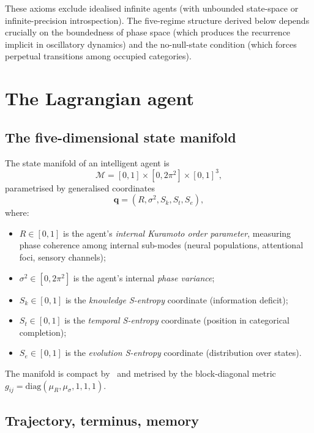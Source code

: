 \documentclass[11pt,twocolumn,a4paper]{article}
\newcommand{\M}{\mathcal{M}}
\newcommand{\Sk}{S_k}
\newcommand{\St}{S_t}
\newcommand{\Se}{S_e}
\newcommand{\qvec}{\mathbf{q}}
\begin{document}
\begin{remark}\label{rem:axioms}
These axioms exclude idealised infinite agents (with unbounded
state-space or infinite-precision introspection). The five-regime
structure derived below depends crucially on the boundedness of phase
space (which produces the recurrence implicit in
oscillatory dynamics) and the no-null-state condition (which forces
perpetual transitions among occupied categories).
\end{remark}

\section{The Lagrangian agent}
\label{sec:agent}

\subsection{The five-dimensional state manifold}

\begin{definition}\label{def:mfld}
The state manifold of an intelligent agent is
\[
\M = [0,1]\times[0,2\pi^2]\times[0,1]^3,
\]
parametrised by generalised coordinates
\[
\qvec=(R,\sigma^2,\Sk,\St,\Se),
\]
where:
\begin{itemize}[leftmargin=*]
\item $R\in[0,1]$ is the agent's \emph{internal Kuramoto order
parameter}, measuring phase coherence among internal sub-modes (neural
populations, attentional foci, sensory channels);
\item $\sigma^2\in[0,2\pi^2]$ is the agent's internal \emph{phase
variance};
\item $\Sk\in[0,1]$ is the \emph{knowledge S-entropy} coordinate
(information deficit);
\item $\St\in[0,1]$ is the \emph{temporal S-entropy} coordinate
(position in categorical completion);
\item $\Se\in[0,1]$ is the \emph{evolution S-entropy} coordinate
(distribution over states).
\end{itemize}
The manifold is compact by~ and metrised by the
block-diagonal metric $g_{ij}=\mathrm{diag}(\mu_R,\mu_\sigma,1,1,1)$.
\end{definition}

\subsection{Trajectory, terminus, memory}
\end{document}
